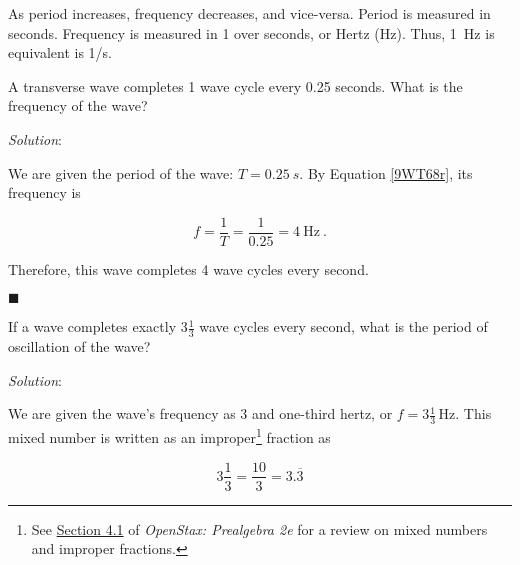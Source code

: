\documentclass[dvipsnames]{article}
\begin{document}
As period increases, frequency decreases, and vice-versa. Period is measured in seconds. Frequency is measured in 1 over seconds, or Hertz (Hz). Thus, \SI{1}{Hz} is equivalent is 1/s.


\begin{example}
    A transverse wave completes 1 wave cycle every 0.25 seconds. What is the frequency of the wave?
\end{example}

\textit{Solution}: 

We are given the period of the wave: $T = \SI{0.25}{s}$. By Equation \ref{9WT68r}, its frequency is

\begin{equation*}
    f = \frac{1}{T} = \frac{1}{0.25} = \SI{4}{\Hz}\ .
\end{equation*}

Therefore, this wave completes 4 wave cycles every second.

\hfill $\blacksquare$

\begin{example}
    If a wave completes exactly $3 \frac{1}{3}$ wave cycles every second, what is the period of oscillation of the wave? 
\end{example}

\textit{Solution}: 

We are given the wave's frequency as 3 and one-third hertz, or $f = 3\frac{1}{3}\,\text{Hz}$. This mixed number is written as an improper\footnote{See \href{https://openstax.org/books/prealgebra-2e/pages/4-1-visualize-fractions}{Section 4.1} of \textit{OpenStax: Prealgebra 2e} for a review on mixed numbers and improper fractions.} fraction as

\begin{equation*}
    3 \frac{1}{3} = \frac{10}{3} = 3.\overline{3}
\end{equation*}
\end{document}
